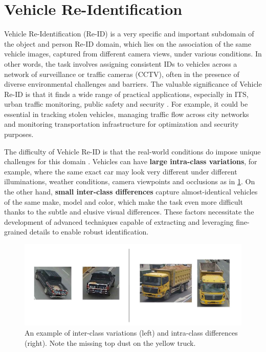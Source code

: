 \section{Vehicle Re-Identification}
Vehicle Re-Identification (Re-ID) is a very specific and important subdomain of the object and person Re-ID domain, which lies on the association of the same vehicle images, captured from different camera views, under various conditions. In other words, the task involves assigning consistent IDs to vehicles across a network of surveillance or traffic cameras (CCTV), often in the presence of diverse environmental challenges and barriers. The valuable significance of Vehicle Re-ID is that it finds a wide range of practical applications, especially in ITS, urban traffic monitoring, public safety and security \cite{DeepHiddenMultiViewInference}. For example, it could be essential in tracking stolen vehicles, managing traffic flow across city networks  and monitoring transportation infrastructure for optimization and security purposes.

The difficulty of Vehicle Re-ID is that the real-world conditions do impose unique challenges for this domain \cite{EfficientBaseline, BagOfTricks, Glamor}. Vehicles can have \textbf{large intra-class variations}, for example, where the same exact car may look very different under different illuminations, weather conditions, camera viewpoints and occlusions as in \ref{fig:IntraInterClass}. On the other hand, \textbf{small inter-class differences} capture almost-identical vehicles of the same make, model and color, which make the task even more difficult thanks to the subtle and elusive visual differences. These factors necessitate the development of advanced techniques capable of extracting and leveraging fine-grained details to enable robust identification.

\begin{figure}[ht]
    \centering
    \includegraphics[width=1.0\textwidth]{images/IntraInterClass.jpg}
    \caption[Intra-Class \& Inter-Class Variations]{An example of inter-class variations (left) and intra-class differences (right). Note the missing top dust on the yellow truck.}
    \label{fig:IntraInterClass}
\end{figure}

